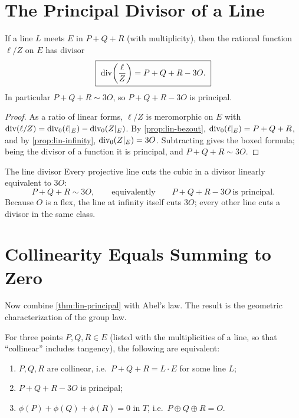 \section{The Principal Divisor of a Line}
\label{sec:lin-principal}

\begin{theorem}
\label{thm:lin-principal}
If a line \(L\) meets \(E\) in \(P + Q + R\) (with multiplicity), then the
rational function \(\ell/Z\) on \(E\) has divisor
\[
  \boxed{\ \operatorname{div}\!\left( \frac{\ell}{Z} \right) = P + Q + R - 3O .\ }
\]
In particular \(P + Q + R \sim 3O\), so \(P + Q + R - 3O\) is principal.
\end{theorem}

\begin{proof}
As a ratio of linear forms, \(\ell/Z\) is meromorphic on \(E\) with
\(\operatorname{div}(\ell/Z) = \operatorname{div}_0(\ell|_E) - \operatorname{div}_0(Z|_E)\). By
\cref{prop:lin-bezout}, \(\operatorname{div}_0(\ell|_E) = P + Q + R\), and by
\cref{prop:lin-infinity}, \(\operatorname{div}_0(Z|_E) = 3O\). Subtracting gives the boxed
formula; being the divisor of a function it is principal, and \(P+Q+R \sim 3O\).
\end{proof}

\begin{keyidea}{The line divisor}
Every projective line cuts the cubic in a divisor linearly equivalent to \(3O\):
\[
  P + Q + R \sim 3O,
  \qquad\text{equivalently}\qquad
  P + Q + R - 3O \ \text{is principal} .
\]
Because \(O\) is a flex, the line at infinity itself cuts \(3O\); every other line
cuts a divisor in the same class.
\end{keyidea}

\section{Collinearity Equals Summing to Zero}
\label{sec:lin-collinear}

Now combine \cref{thm:lin-principal} with Abel's law. The result is the geometric
characterization of the group law.

\begin{theorem}
\label{thm:lin-collinear}
For three points \(P, Q, R \in E\) (listed with the multiplicities of a line, so
that ``collinear'' includes tangency), the following are equivalent:
\begin{enumerate}
\item \(P, Q, R\) are collinear, i.e.\ \(P + Q + R = L \cdot E\) for some line
  \(L\);
\item \(P + Q + R - 3O\) is principal;
\item \(\phi(P) + \phi(Q) + \phi(R) = 0\) in \(T\), i.e.\
  \(P \oplus Q \oplus R = O\).
\end{enumerate}
\end{theorem}

